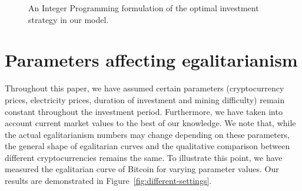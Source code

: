\begin{figure}
  \noindent{}
  \caption{An Integer Programming formulation of the optimal investment strategy in our model.}
  \label{fig:IP}
\end{figure}


\section{Parameters affecting egalitarianism}\label{sec:appendix-qualitative-difference}

Throughout this paper, we have assumed certain parameters (cryptocurrency
prices, electricity prices, duration of investment and mining difficulty) remain
constant throughout the investment period. Furthermore, we have taken into account
current market values to the best of our knowledge. We note that, while the
actual egalitarianism numbers may change depending on these parameters, the
general shape of egalitarian curves and the qualitative comparison between
different cryptocurrencies remains the same. To illustrate this point, we have
measured the egalitarian curve of Bitcoin for varying parameter values. Our
results are demonstrated in Figure~\ref{fig:different-settings}.

